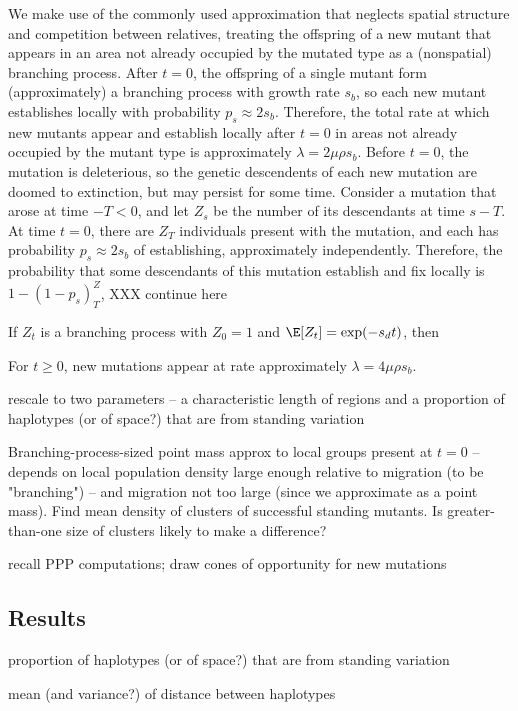 \documentclass{article}
\begin{document}
We make use of the commonly used approximation
that neglects spatial structure and competition between relatives,
treating the offspring of a new mutant that appears in an area not already occupied by the mutated type
as a (nonspatial) branching process.
After $t=0$, the offspring of a single mutant form (approximately) a branching process with growth rate $s_b$,
so each new mutant establishes locally with probability $p_s \approx 2s_b$.
Therefore, the total rate at which new mutants appear and establish locally after $t=0$ in areas not already occupied by the mutant type
is approximately $\lambda = 2 \mu \rho s_b$.
Before $t=0$, the mutation is deleterious, so the genetic descendents of each new mutation are doomed to extinction,
but may persist for some time.
Consider a mutation that arose at time $-T<0$, and let $Z_s$ be the number of its descendants at time $s-T$.
At time $t=0$, there are $Z_T$ individuals present with the mutation,
and each has probability $p_s \approx 2s_b$ of establishing, approximately independently.
Therefore, the probability that some descendants of this mutation establish and fix locally is
$1-(1-p_s)^Z_T$, XXX continue here

If $Z_t$ is a branching process with $Z_0 = 1$ and $\E[Z_t] = \exp(-s_d t)$, then



For $t \ge 0$, new mutations appear at rate approximately $\lambda = 4 \mu \rho s_b$.

rescale to two parameters
-- a characteristic length of regions and a proportion of haplotypes (or of space?) that are from standing variation

Branching-process-sized point mass approx to local groups present at $t=0$
-- depends on local population density large enough relative to migration (to be "branching")
-- and migration not too large (since we approximate as a point mass).
Find mean density of clusters of successful standing mutants. 
Is greater-than-one size of clusters likely to make a difference? 
 
recall PPP computations; draw cones of opportunity for new mutations 
 
\subsection{Results} 
 
proportion of haplotypes (or of space?) that are from standing variation 
 
mean (and variance?) of distance between haplotypes 
 
\end{document}
